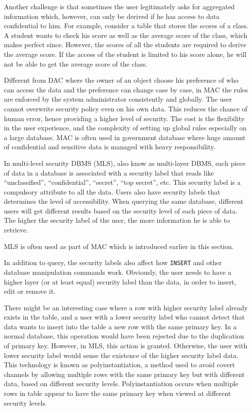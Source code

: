 Another challenge is that sometimes the user legitimately asks for aggregated information which, however, can only be derived if he has access to data confidential to him. For example, consider a table that stores the scores of a class. A student wants to check his score as well as the average score of the class, which makes perfect since. However, the scores of all the students are required to derive the average score. If the access of the student is limited to his score alone, he will not be able to get the average score of the class.

Different from DAC where the owner of an object choose his preference of who can access the data and the preference can change case by case, in MAC the rules are enforced by the system administrator consistently and globally. The user cannot overwrite security policy even on his own data. This reduces the chance of human error, hence providing a higher level of security. The cost is the flexibility in the user experience, and the complexity of setting up global rules especially on a large database. MAC is often used in government database where huge amount of confidential and sensitive data is managed with heavy responsibility.

In multi-level security DBMS (MLS), also know as multi-layer DBMS, each piece of data in a database is associated with a security label that reads like ``unclassified'', ``confidential'', ``secret'', ``top secret'', etc. This security label is a compulsory attribute to all the data. Users also have security labels that determines the level of accessibility. When querying the same database, different users will get different results based on the security level of each piece of data. The higher the security label of the user, the more information he is able to retrieve.

MLS is often used as part of MAC which is introduced earlier in this section.

In addition to query, the security labels also affect how \verb|INSERT| and other database manipulation commands work. Obviously, the user needs to have a higher layer (or at least equal) security label than the data, in order to insert, edit or remove it. 

There might be an interesting case where a row with higher security label already exists in the table, and a  user with a lower security label who cannot detect that data wants to insert into the table a new row with the same primary key. In a normal database, this operation would have been rejected due to the duplication of primary key. However, in MLS, this action is granted. Otherwise, the user with lower security label would sense the existence of the higher security label data. This technology is known as polyinstantiation, a method used to avoid covert channels by allowing multiple rows with the same primary key but with different data, based on different security levels. Polyinstantiation occurs when multiple rows in table appear to have the same primary key when viewed at different security levels.


